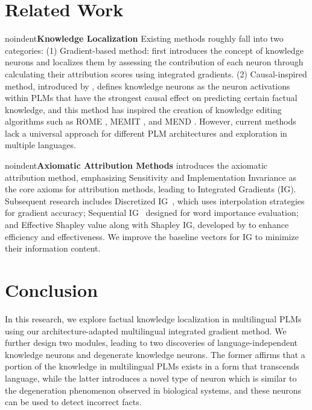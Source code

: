 \documentclass[]{article}
\newcommand{\vpara}[1]{noindent\textbf{#1 }}%
\begin{document}
\vspace{-3.22mm}
\section{Related Work}
\vpara{Knowledge Localization}
Existing methods roughly fall into two categories: (1) Gradient-based method: \citeauthor{dai2022kn} first introduces the concept of knowledge neurons and localizes them by assessing the contribution of each neuron \cite{key_value} through calculating their attribution scores using integrated gradients. (2) Causal-inspired method, introduced by \citeauthor{meng2022locating}, defines knowledge neurons as the neuron activations within PLMs that have the strongest causal effect on predicting certain factual knowledge, and this method has inspired the creation of knowledge editing algorithms such as ROME \cite{meng2022locating}, MEMIT \cite{meng2022memit}, and MEND \cite{mend}. However, current methods lack a universal approach for different PLM architectures and exploration in multiple languages.

\vpara{Axiomatic Attribution Methods}
\citeauthor{ig} introduces the axiomatic attribution method, emphasizing Sensitivity and Implementation Invariance as the core axioms for attribution methods, leading to Integrated Gradients (IG). Subsequent research includes Discretized IG~\cite{DIG}, which uses interpolation strategies for gradient accuracy; Sequential IG~\cite{enguehard2023sequential} designed for word importance evaluation; and Effective Shapley value along with Shapley IG, developed by \citeauthor{transparent} to enhance efficiency and effectiveness. We improve the baseline vectors for IG to minimize their information content.

\vspace{-3.23mm}
\section{Conclusion}
In this research, we explore factual knowledge localization in multilingual PLMs using our architecture-adapted multilingual integrated gradient method. We further design two modules, leading to two discoveries of language-independent knowledge neurons and degenerate knowledge neurons. The former affirms that a portion of the knowledge in multilingual PLMs exists in a form that transcends language, while the latter introduces a novel type of neuron which is similar to the degeneration phenomenon observed in biological systems, and these neurons can be used to detect incorrect facts.
\end{document}
